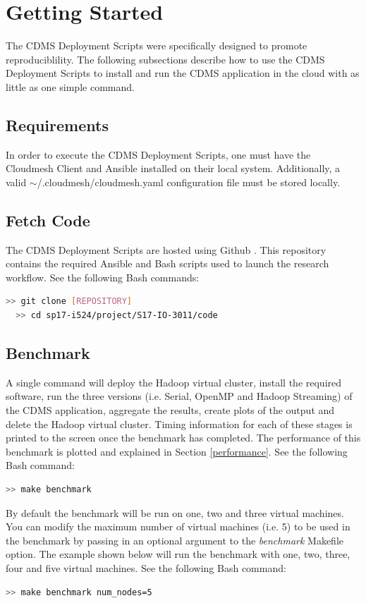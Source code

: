 \documentclass[9pt,twocolumn,twoside]{../../styles/osajnl}
\begin{document}
\section{Getting Started}
The CDMS Deployment Scripts were specifically designed to promote
reproduciblility. The following subsections describe how to use the
CDMS Deployment Scripts to install and run the CDMS application in the
cloud with as little as one simple command.
\subsection{Requirements} \label{req}
In order to execute the CDMS Deployment Scripts, one must have the
Cloudmesh Client and Ansible installed on their local
system. Additionally, a valid $\sim$/.cloudmesh/cloudmesh.yaml
configuration file must be stored locally.
\subsection{Fetch Code} \label{git}
The CDMS Deployment Scripts are hosted using Github
\cite{i524-github}. This repository contains the required Ansible and
Bash scripts used to launch the research workflow.
\noindent See the following Bash commands:
\begin{lstlisting}[language=bash]
  >> git clone [REPOSITORY]
  >> cd sp17-i524/project/S17-IO-3011/code
\end{lstlisting}
\subsection{Benchmark} \label{benchmark-info}
A single command will deploy the Hadoop virtual cluster, install the
required software, run the three versions (i.e. Serial, OpenMP and
Hadoop Streaming) of the CDMS application, aggregate the results,
create plots of the output and delete the Hadoop virtual
cluster. Timing information for each of these stages is printed to the
screen once the benchmark has completed. The performance of this
benchmark is plotted and explained in Section \ref{performance}.
\noindent See the following Bash command:
\begin{lstlisting}[language=bash]
  >> make benchmark
\end{lstlisting}
By default the benchmark will be run on one, two and three virtual
machines. You can modify the maximum number of virtual machines
(i.e. 5) to be used in the benchmark by passing in an optional
argument to the \emph{benchmark} Makefile option. The example shown
below will run the benchmark with one, two, three, four and five
virtual machines.
\noindent See the following Bash command:
\begin{lstlisting}[language=bash]
  >> make benchmark num_nodes=5
\end{lstlisting}
\end{document}
